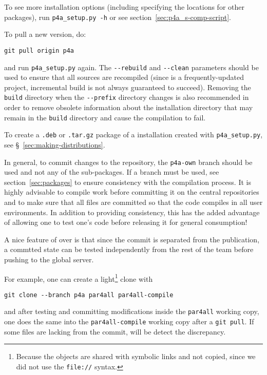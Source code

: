\documentclass[a4paper]{article}
\begin{document}
To see more installation options (including specifying the locations for
other packages), run \verb|p4a_setup.py -h| or see
section~\ref{sec:p4a_s-comp-script}.

To pull a new version, do:
\begin{verbatim}
git pull origin p4a
\end{verbatim}

and run \verb|p4a_setup.py| again. The
\verb|--rebuild| and \verb|--clean| parameters should be used to
ensure that all sources are recompiled
(since \Apips is a frequently-updated project, incremental build is
not always guaranteed to succeed). Removing the \texttt{build}
directory
when the \verb|--prefix| directory changes is also recommended
in order to remove obsolete
information about the installation directory that may remain in
the \texttt{build} directory and cause the compilation to fail.

To create a \texttt{.deb} or \texttt{.tar.gz} package of a \Apfa installation
created with \verb|p4a_setup.py|, see \S~\ref{sec:making-distributions}.

In general, to commit changes to the \Agit repository, the
\texttt{p4a-own} branch should be used and not any of the \Apfa
sub-packages. If a branch must be used, see section~\ref{sec:packages}
to ensure consistency with the \Apfa compilation process. It is highly
advisable to compile work before
committing it on the central repositories and to make sure that all
files are committed so that the code compiles in all user
environments. In addition to providing
consistency, this has the added advantage of
allowing one to test one's code before releasing it for general
consumption! \smiley

A nice feature of \Agit over \Asvn is that since the commit is separated from
the publication, a commtted state can be tested independently from the
rest of the team before pushing to the global server.

For example, one can create a light\footnote{Because the objects are
  shared with symbolic links and not copied, since we did not use the
  \texttt{file://} syntax.} clone with
\begin{verbatim}
git clone --branch p4a par4all par4all-compile
\end{verbatim}
and after testing and committing modifications inside the
\texttt{par4all} working copy, one does the same into the
\texttt{par4all-compile} working copy after a \texttt{git pull}.
If some files are lacking from the commit, \Agit will be detect the discrepancy.
\end{document}
